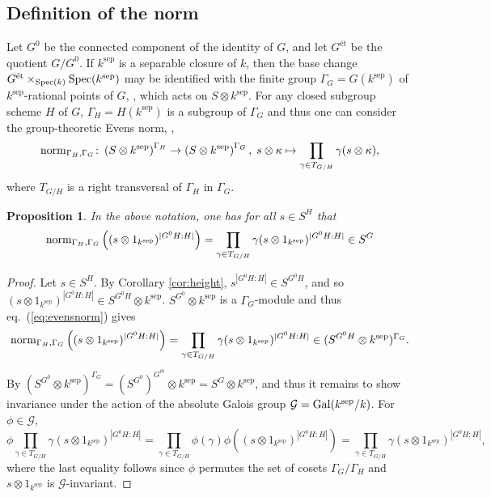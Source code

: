 \documentclass[12pt]{amsart}
\newtheorem{proposition}[theorem]{Proposition}
\theoremstyle{definition}
\begin{document}
\subsection{Definition of the norm}\label{sec:defnorm}
Let $G^0$ be the connected component of the identity of $G$, and let $G^{\text{\'et}}$ be the quotient $G/G^0$.  If $k^{\text{sep}}$ is a separable closure of $k$, then the base change $G^{\text{\'et}}\times_{{\rm Spec}(k)}{\rm Spec}(k^{\text{sep}})$ may be identified with the finite group $\Gamma_G=G(k^{\text{sep}})$ of $k^{\text{sep}}$-rational points of $G$, \cite[6.4]{MR547117}, which acts on $S\otimes k^{\text{sep}}$. For any closed subgroup scheme $H$ of $G$, $\Gamma_H=H(k^{\text{sep}})$ is a subgroup of $\Gamma_G$ and thus one can consider the group-theoretic Evens norm, \cite[6.1]{Evens},
\begin{equation}\label{eq:evensnorm}
	{\rm norm}_{\Gamma_H,\Gamma_G} \colon \left(S\otimes k^{\text{sep}}\right)^{\Gamma_H}\rightarrow\left( S\otimes k^{\text{sep}}\right)^{\Gamma_G},\; s\otimes \kappa\mapsto \prod_{\gamma \in T_{G/H}}\gamma (s\otimes \kappa),
\end{equation}
where $T_{G/H}$ is a right transversal of $\Gamma_H$ in $\Gamma_G$.

\begin{proposition}\label{prop:norminv}
	In the above notation, one has for all $s\in S^H$ that
	\[
	{\rm norm}_{\Gamma_H,\Gamma_G}\left((s\otimes 1_{k^{\text{sep}}})^{|G^0H{:}H|}\right)
	=
	\prod_{\gamma \in T_{G/H}}\gamma (s\otimes 1_{k^{\text{sep}}})^{|G^0H:H|}
	\in S^G
	\]
\end{proposition}
\begin{proof}
	Let $s\in S^H$. By Corollary \ref{cor:height}, $s^{|G^0H{:}H|}\in S^{G^0H}$, and so $(s\otimes 1_{k^{\text{sep}}})^{|G^0H{:}H|}\in S^{G^0H}\otimes k^{\text{sep}}$.  $S^{G^0}\otimes k^{\text{sep}}$ is a $\Gamma_G$-module and thus eq.\   (\ref{eq:evensnorm}) gives
	\[
	{\rm norm}_{\Gamma_H,\Gamma_G}\left((s\otimes 1_{k^{\text{sep}}})^{|G^0H{:}H|}\right)
	=
	\prod_{\gamma \in T_{G/H}}\gamma (s\otimes 1_{k^{\text{sep}}})^{|G^0H{:}H|}
	\in ( S^{G^0H}\otimes k^{\text{sep}})^{\Gamma_G}.
	\]
	By \cite[I.2.10(3)]{MR2015057} $( S^{G^0}\otimes k^{\text{sep}})^{\Gamma_G}=( S^{G^0})^{G^{\text{\'et}}}\otimes k^{\text{sep}}=S^G\otimes k^{\text{sep}}$, and thus it remains to show invariance under the action of the absolute Galois group $\mathcal{G}={\rm Gal}(k^{\text{sep}}/k)$. For $\phi\in\mathcal{G}$,
	\begin{equation}\label{eq:normgal}
		\phi\prod_{\gamma \in T_{G/H}}\gamma (s\otimes 1_{k^{\text{sep}}})^{|G^0H{:}H|}=
		\prod_{\gamma \in T_{G/H}}\phi(\gamma)\phi( (s\otimes 1_{k^{\text{sep}}})^{|G^0H{:}H|})=
		\prod_{\gamma \in T_{G/H}}\gamma (s\otimes 1_{k^{\text{sep}}})^{|G^0H{:}H|},
	\end{equation}
	where the last equality follows since $\phi$ permutes the set of cosets $\Gamma_G/\Gamma_H$ and $s\otimes 1_{k^{\text{sep}}}$ is $\mathcal{G}$-invariant.
\end{proof}
\end{document}

